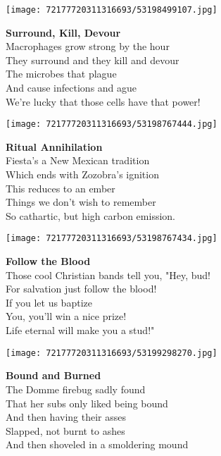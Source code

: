 \documentclass[10pt,letterpaper]{article}
\begin{document}
\begin{center}\texttt{[image: 72177720311316693/53198499107.jpg]}
\end{center}
\begin{center}
\textbf{Surround, Kill, Devour}\\
\vskip 0.2in
Macrophages grow strong by the hour\\
They surround and they kill and devour\\
The microbes that plague\\
And cause infections and ague\\
We're lucky that those cells have that power!\\
\end{center}
\pagebreak

\begin{center}\texttt{[image: 72177720311316693/53198767444.jpg]}
\end{center}
\begin{center}
\textbf{Ritual Annihilation}\\
\vskip 0.2in
Fiesta's a New Mexican tradition\\
Which ends with Zozobra's ignition\\
This reduces to an ember\\
Things we don't wish to remember\\
So cathartic, but high carbon emission.\\
\end{center}
\pagebreak

\begin{center}\texttt{[image: 72177720311316693/53198767434.jpg]}
\end{center}
\begin{center}
\textbf{Follow the Blood}\\
\vskip 0.2in
Those cool Christian bands tell you, "Hey, bud!\\
For salvation just follow the blood!\\
If you let us baptize\\
You, you'll win a nice prize!\\
Life eternal will make you a stud!"\\
\end{center}
\pagebreak

\begin{center}\texttt{[image: 72177720311316693/53199298270.jpg]}
\end{center}
\begin{center}
\textbf{Bound and Burned}\\
\vskip 0.2in
The Domme firebug sadly found\\
That her subs only liked being bound\\
And then having their asses\\
Slapped, not burnt to ashes\\
And then shoveled in a smoldering mound\\
\end{center}
\pagebreak
\end{document}
